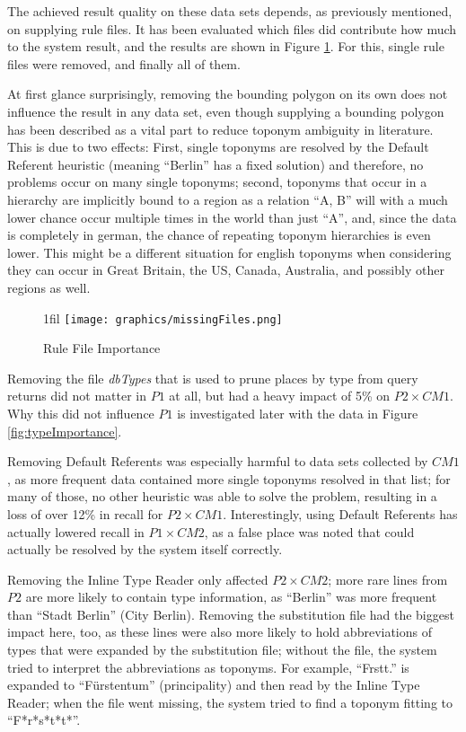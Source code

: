 \documentclass[11pt]{article}
\makeatletter
\newcommand*{\centerfloat}{
  \parindent \z@
  \leftskip \z@ \@plus 1fil \@minus \textwidth
  \rightskip\leftskip
  \parfillskip \z@skip}
\makeatother
\begin{document}
The achieved result quality on these data sets depends, as previously mentioned, on supplying rule files. It has been evaluated which files did contribute how much to the system result, and the results are shown in Figure \ref{fig:missingFiles}. For this, single rule files were removed, and finally all of them.

At first glance surprisingly, removing the bounding polygon on its own does not influence the result in any data set, even though supplying a bounding polygon has been described as a vital part to reduce toponym ambiguity in literature. This is due to two effects: First, single toponyms are resolved by the Default Referent heuristic (meaning ``Berlin'' has a fixed solution) and therefore, no problems occur on many single toponyms; second, toponyms that occur in a hierarchy are implicitly bound to a region as a relation ``A, B'' will with a much lower chance occur multiple times in the world than just ``A'', and, since the data is completely in german, the chance of repeating toponym hierarchies is even lower. This might be a different situation for english toponyms when considering they can occur in Great Britain, the US, Canada, Australia, and possibly other regions as well.

\begin{figure}[htb!]
  \centerfloat
    \texttt{[image: graphics/missingFiles.png]}
  \caption{Rule File Importance}
  \label{fig:missingFiles}
\end{figure}

Removing the file \emph{dbTypes} that is used to prune places by type from query returns did not matter in $P1$ at all, but had a heavy impact of 5\% on $P2\times CM1$. Why this did not influence $P1$ is investigated later with the data in Figure \ref{fig:typeImportance}.

Removing Default Referents was especially harmful to data sets collected by $CM1$, as more frequent data contained more single toponyms resolved in that list; for many of those, no other heuristic was able to solve the problem, resulting in a loss of over 12\% in recall for $P2\times CM1$. Interestingly, using Default Referents has actually lowered recall in $P1\times CM2$, as a false place was noted that could actually be resolved by the system itself correctly.

Removing the Inline Type Reader only affected $P2\times CM2$; more rare lines from $P2$ are more likely to contain type information, as ``Berlin'' was more frequent than ``Stadt Berlin'' (City Berlin). Removing the substitution file had the biggest impact here, too, as these lines were also more likely to hold abbreviations of types that were expanded by the substitution file; without the file, the system tried to interpret the abbreviations as toponyms. For example, ``Frstt.'' is expanded to ``Fürstentum'' (principality) and then read by the Inline Type Reader; when the file went missing, the system tried to find a toponym fitting to ``F*r*s*t*t*''.
\end{document}
